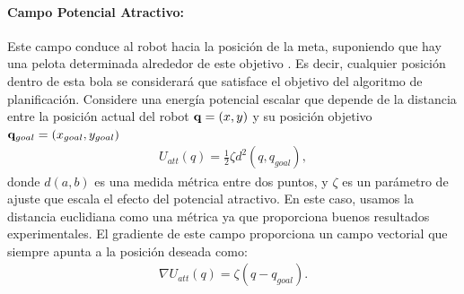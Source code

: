 \paragraph{Campo Potencial Atractivo:}
Este campo conduce al robot hacia la posición de la meta, suponiendo que hay una 
pelota determinada alrededor de este objetivo \cite{koren1991potential}. Es 
decir, cualquier posición dentro de esta bola se considerará que satisface el objetivo 
del algoritmo de planificación. Considere una energía potencial escalar que depende 
de la distancia entre la posición actual del robot $\mathbf q=(x,y)$ y su posición objetivo 
$\mathbf q_{goal} = (x_{goal}, y_{goal})$
\begin{align}
\label{eqn:pot_attr}
U_{att}(q) = \frac{1}{2}\zeta d^{2} (q,q_{goal}),
\end{align}
donde $d(a,b)$ es una medida métrica entre dos puntos, y $\zeta$ es un 
parámetro de ajuste que escala el efecto del potencial atractivo. En este 
caso, usamos la distancia euclidiana como una métrica ya que proporciona 
buenos resultados experimentales. El gradiente de este campo proporciona un 
campo vectorial que siempre apunta a la posición deseada como:
\begin{align}
\label{eqn:gradient_att}
\nabla U_{att}(q)=\zeta(q-q_{goal}).
\end{align}

